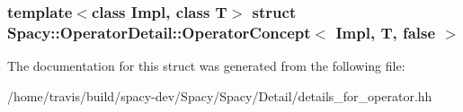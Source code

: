 \subsubsection*{template$<$class Impl, class T$>$ struct Spacy\-::\-Operator\-Detail\-::\-Operator\-Concept$<$ Impl, T, false $>$}



\-The documentation for this struct was generated from the following file\-:\begin{DoxyCompactItemize}
\item 
/home/travis/build/spacy-\/dev/\-Spacy/\-Spacy/\-Detail/details\-\_\-for\-\_\-operator.\-hh\end{DoxyCompactItemize}
